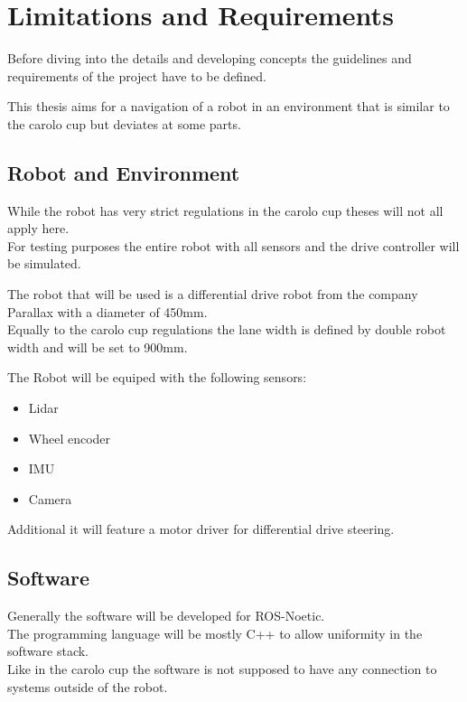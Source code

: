 \chapter{Limitations and Requirements}
\label{Limitations and Requirements}


Before diving into the details and developing concepts the guidelines and requirements of the project have to be defined.

This thesis aims for a navigation of a robot in an environment that is similar to the carolo cup but deviates at some parts.

\section{Robot and Environment}
While the robot has very strict regulations in the carolo cup theses will not all apply here.\\

For testing purposes the entire robot with all sensors and the drive controller will be simulated.

The robot that will be used is a differential drive robot from the company Parallax with a diameter of 450mm.\\

Equally to the carolo cup regulations the lane width is defined by double robot width and will be set to 900mm. 

The Robot will be equiped with the following sensors:

\begin{itemize}
	\item Lidar
	\item Wheel encoder
	\item IMU
	\item Camera
\end{itemize}

Additional it will feature a motor driver for differential drive steering.

\section{Software}
Generally the software will be developed for ROS-Noetic.\\
The programming language will be mostly C++ to allow uniformity in the software stack.\\
Like in the carolo cup the software is not supposed to have any connection to systems outside of the robot.\\

